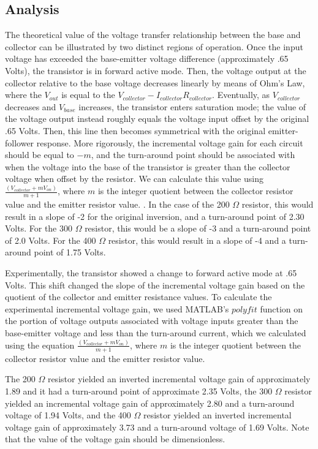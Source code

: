 \documentclass{article}
\begin{document}
\subsection{Analysis}
The theoretical value of the voltage transfer relationship between the base and collector can be illustrated by two distinct regions of operation. Once the input voltage has exceeded the base-emitter voltage difference (approximately .65 Volts), the transistor is in forward active mode. Then, the voltage output at the collector relative to the base voltage decreases linearly by means of Ohm's Law, where the $V_{out}$ is equal to the $V_{collector} - I_{collector}R_{collector}$. 
Eventually, as $V_{collector}$ decreases and $V_{base}$ increases, the transistor enters saturation mode; the value of the voltage output instead roughly equals the voltage input offset by the original .65 Volts. Then, this line then becomes symmetrical with the original emitter-follower response. More rigorously, the incremental voltage gain for each circuit should be equal to $-m$, and the turn-around point should be associated with when the voltage into the base of the transistor is greater than the collector voltage when offset by the resistor. We can calculate this value using $\frac{(V_{collector} + mV_{on})}{m+1}$, where $m$ is the integer quotient between the collector resistor value and the emitter resistor value.  . In the case of the 200 $\Omega$ resistor, this would result in a slope of -2 for the original inversion, and a turn-around point of 2.30 Volts. For the 300 $\Omega$ resistor, this would be a slope of -3 and a turn-around point of 2.0 Volts. For the 400 $\Omega$ resistor, this would result in a slope of -4 and a turn-around point of 1.75 Volts.

Experimentally, the transistor showed a change to forward active mode at .65 Volts. This shift changed the slope of the incremental voltage gain based on the quotient of the collector and emitter resistance values. To calculate the experimental incremental voltage gain, we used MATLAB's $polyfit$ function on the portion of voltage outputs associated with voltage inputs greater than the base-emitter voltage and less than the turn-around current, which we calculated using the equation $\frac{(V_{collector} + mV_{on})}{m+1}$, where $m$ is the integer quotient between the collector resistor value and the emitter resistor value.  

The 200 $\Omega$ resistor yielded an inverted incremental voltage gain of approximately 1.89 and it had a turn-around point of approximate 2.35 Volts, the 300 $\Omega$ resistor yielded an incremental voltage gain of approximately 2.80 and a turn-around voltage of 1.94 Volts, and the 400 $\Omega$ resistor yielded an inverted incremental voltage gain of approximately 3.73 and a turn-around voltage of 1.69 Volts. Note that the value of the voltage gain should be dimensionless.
\end{document}
